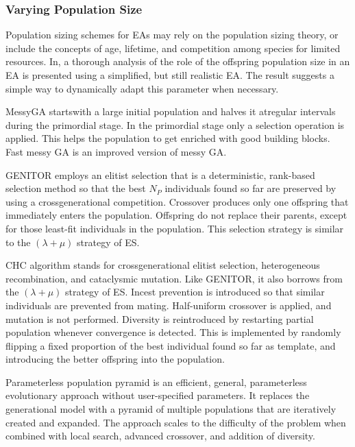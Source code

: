 \documentclass[14pt]{article}
\numberwithin{equation}{subsection}
\begin{document}
			\subsubsection{Varying Population Size}Population sizing schemes for EAs may rely on the population sizing
			theory, or include the concepts of age, lifetime, and competition among species for limited resources. In, a
			thorough analysis of the role of the offspring population size in an EA is presented using a simplified, but
			still realistic EA. The result suggests a simple way to dynamically adapt this parameter when necessary. \par
			MessyGA startswith a large initial population and halves it atregular intervals during the primordial stage.
			In the primordial stage only a selection operation is applied. This helps the population to get enriched with
			good building blocks. Fast messy GA is an improved version of messy GA. \par
			GENITOR employs an elitist selection that is a deterministic, rank-based selection method so that the
			best $N_P$ individuals found so far are preserved by using a crossgenerational competition. Crossover
			produces only one offspring that immediately enters the population. Offspring do not replace their parents,
			except for those least-fit individuals in the population. This selection strategy is similar to the
			$(\lambda + \mu)$ strategy of ES. \par
			CHC algorithm stands for crossgenerational elitist selection, heterogeneous recombination, and
			cataclysmic mutation. Like GENITOR, it also borrows from the $(\lambda + \mu)$ strategy of ES. Incest
			prevention is introduced so that similar individuals are prevented from mating. Half-uniform crossover is
			applied, and mutation is not performed. Diversity is reintroduced by restarting partial population whenever
			convergence is detected. This is implemented by randomly flipping a fixed proportion of the best individual
			found so far as template, and introducing the better offspring into the population. \par
			Parameterless population pyramid is an efficient, general, parameterless evolutionary approach without
			user-specified parameters. It replaces the generational model with a pyramid of multiple populations that are
			iteratively created and expanded. The approach scales to the difficulty of the problem when combined with
			local search, advanced crossover, and addition of diversity.
			
\end{document}
